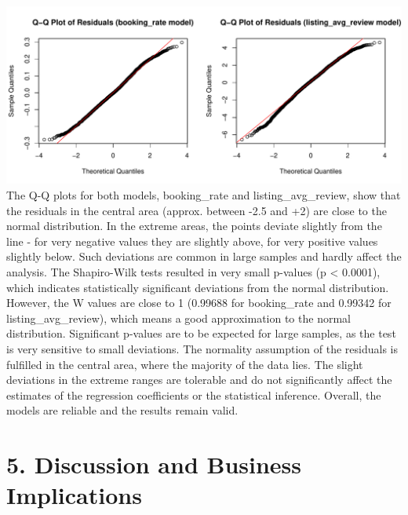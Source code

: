 \documentclass[
  12pt,
]{article}
\begin{document}
\includegraphics{assignment2_final_2_files/figure-latex/unnamed-chunk-20-1.pdf}
The Q-Q plots for both models, booking\_rate and listing\_avg\_review,
show that the residuals in the central area (approx. between -2.5 and
+2) are close to the normal distribution. In the extreme areas, the
points deviate slightly from the line - for very negative values they
are slightly above, for very positive values slightly below. Such
deviations are common in large samples and hardly affect the analysis.
The Shapiro-Wilk tests resulted in very small p-values (p \textless{}
0.0001), which indicates statistically significant deviations from the
normal distribution. However, the W values are close to 1 (0.99688 for
booking\_rate and 0.99342 for listing\_avg\_review), which means a good
approximation to the normal distribution. Significant p-values are to be
expected for large samples, as the test is very sensitive to small
deviations. The normality assumption of the residuals is fulfilled in
the central area, where the majority of the data lies. The slight
deviations in the extreme ranges are tolerable and do not significantly
affect the estimates of the regression coefficients or the statistical
inference. Overall, the models are reliable and the results remain
valid.

\section{5. Discussion and Business
Implications}\label{discussion-and-business-implications}
\end{document}

